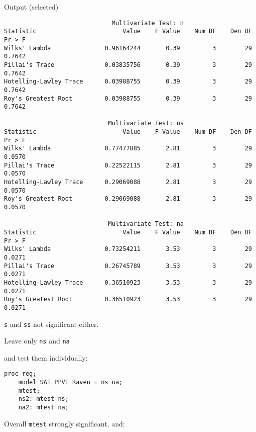 \begin{frame}[fragile]{Output (selected)}

{\scriptsize
\begin{verbatim}
                              Multivariate Test: n
Statistic                        Value    F Value    Num DF    Den DF    Pr > F
Wilks' Lambda               0.96164244       0.39         3        29    0.7642
Pillai's Trace              0.03835756       0.39         3        29    0.7642
Hotelling-Lawley Trace      0.03988755       0.39         3        29    0.7642
Roy's Greatest Root         0.03988755       0.39         3        29    0.7642

                             Multivariate Test: ns
Statistic                        Value    F Value    Num DF    Den DF    Pr > F
Wilks' Lambda               0.77477885       2.81         3        29    0.0570
Pillai's Trace              0.22522115       2.81         3        29    0.0570
Hotelling-Lawley Trace      0.29069088       2.81         3        29    0.0570
Roy's Greatest Root         0.29069088       2.81         3        29    0.0570

                             Multivariate Test: na
Statistic                        Value    F Value    Num DF    Den DF    Pr > F
Wilks' Lambda               0.73254211       3.53         3        29    0.0271
Pillai's Trace              0.26745789       3.53         3        29    0.0271
Hotelling-Lawley Trace      0.36510923       3.53         3        29    0.0271
Roy's Greatest Root         0.36510923       3.53         3        29    0.0271
\end{verbatim}
}

\texttt{s} and \texttt{ss} not significant either.

  
\end{frame}

\begin{frame}[fragile]{Leave only \texttt{ns} and \texttt{na}}

and test them individually:

\begin{verbatim}
proc reg;
    model SAT PPVT Raven = ns na;
    mtest;
    ns2: mtest ns;
    na2: mtest na;
\end{verbatim}

Overall \texttt{mtest} strongly significant, and:

\end{frame}


